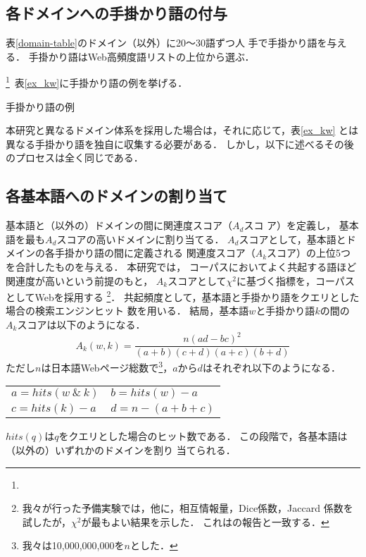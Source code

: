 \documentclass[japanese]{jnlp_1.4}
\newcommand{\revise}[1]{}
\newcommand{\dom}[1]{}
\begin{document}
\subsection{各ドメインへの手掛かり語の付与 \label{keyword-assignment}}

表\ref{domain-table}のドメイン（\dom{ドメイン無し}以外）に20〜30語ずつ人
手で手掛かり語を与える．
手掛かり語はWeb高頻度語リストの上位から選ぶ．
\revise{その際，判断に迷う語は無視し，当該ドメインへの所属が比較的明確な
もののみを選ぶようにした．}
\footnote{\revise{
今回は著者1名がこの作業を行った．
作業者間でどの程度判断がばらつくのか，そしてそのばらつきが辞
書自動構築と後述するブログ分類にどのような影響を与えるのかは今後検討する
必要がある．
しかし，上記の作業仕様により，作業者が異なっても判断に大き
なばらつきはないと予想している．}}\ 
表\ref{ex_kw}に手掛かり語の例を挙げる．


\begin{table}[t]
\caption{手掛かり語の例}
\label{ex_kw}
\begin{center}

\end{center}
\end{table}

本研究と異なるドメイン体系を採用した場合は，それに応じて，表\ref{ex_kw}
とは異なる手掛かり語を独自に収集する必要がある．
しかし，以下に述べるその後のプロセスは全く同じである．


\subsection{各基本語へのドメインの割り当て \label{association}}

基本語と（\dom{ドメイン無し}以外の）ドメインの間に関連度スコア（$A_d$スコ
ア）を定義し，
基本語を最も$A_d$スコアの高いドメインに割り当てる．
$A_d$スコアとして，基本語とドメインの各手掛かり語の間に定義される
関連度スコア（$A_k$スコア）の上位5つを合計したものを与える．
本研究では，
コーパスにおいてよく共起する語ほど関連度が高いという前提のもと，
$A_k$スコアとして$\chi^2$に基づく指標を，コーパスとしてWebを採用する
\footnote{我々が行った予備実験では，他に，相互情報量，Dice係数，Jaccard
係数を試したが，$\chi^2$が最もよい結果を示した．
これはの報告と一致する．}．
共起頻度として，基本語と手掛かり語をクエリとした場合の検索エンジンヒット
数を用いる\cite{佐々木:佐藤:宇津呂:2006}．
結局，基本語$w$と手掛かり語$k$の間の$A_k$スコアは以下のようになる．
$$A_k(w,k)=
\frac{n(ad-bc)^{2}}{(a+b)(c+d)(a+c)(b+d)}$$
ただし$n$は日本語Webページ総数で\footnote{
我々は10,000,000,000を$n$とした．
}，$a$から$d$はそれぞれ以下のようになる．
\begin{center}
\begin{tabular}{ll}
$a = hits(w\ \&\ k)$ &
$b = hits(w) - a$ \\
$c = hits(k) - a$ &
$d = n - (a + b + c)$
\end{tabular}
\end{center}
$hits(q)$は$q$をクエリとした場合のヒット数である．
この段階で，各基本語は（\dom{ドメイン無し}以外の）いずれかのドメインを割り
当てられる．
\end{document}
